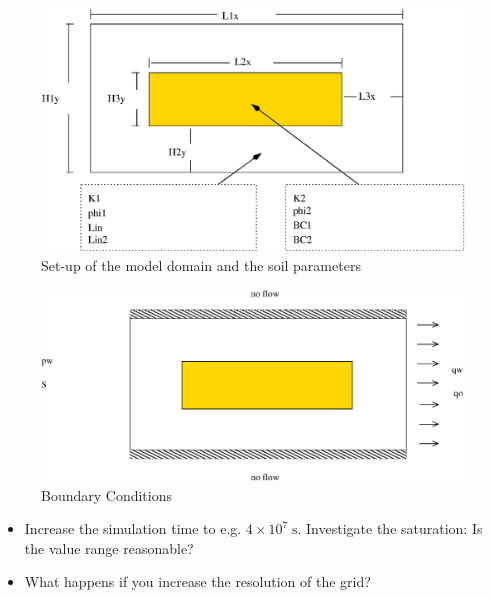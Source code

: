 \begin{figure}[ht]
\centering
\includegraphics[width=0.8\linewidth,keepaspectratio]{EPS/Ex2_Domain.eps}
\caption{Set-up of the model domain and the soil parameters}\label{tutorial-coupled:ex2_Domain}
\end{figure}

\begin{figure}[ht]
\centering
\includegraphics[width=0.8\linewidth,keepaspectratio]{EPS/Ex2_Boundary.eps}
\caption{Boundary Conditions}\label{tutorial-coupled:ex2_BC}
\end{figure}

\begin{itemize}
 \item Increase the simulation time to e.g. $4\times 10^7 \;\text{s}$. Investigate the saturation: Is the value range reasonable?
 \item What happens if you increase the resolution of the grid?
\end{itemize}

